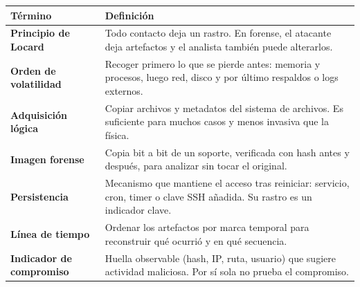 \documentclass[11pt,a4paper]{article}
\begin{document}
\small
\begin{longtable}{@{}>{\raggedright\arraybackslash}p{4.2cm}>{\raggedright\arraybackslash}p{\dimexpr\linewidth-4.2cm-12pt\relax}@{}}
\toprule
\textbf{Término} & \textbf{Definición}\\
\midrule
\endhead
\bottomrule
\endlastfoot
\textbf{Principio de Locard} & Todo contacto deja un rastro. En forense, el atacante deja artefactos y el analista también puede alterarlos.\\
\textbf{Orden de volatilidad} & Recoger primero lo que se pierde antes: memoria y procesos, luego red, disco y por último respaldos o logs externos.\\
\textbf{Adquisición lógica} & Copiar archivos y metadatos del sistema de archivos. Es suficiente para muchos casos y menos invasiva que la física.\\
\textbf{Imagen forense} & Copia bit a bit de un soporte, verificada con hash antes y después, para analizar sin tocar el original.\\
\textbf{Persistencia} & Mecanismo que mantiene el acceso tras reiniciar: servicio, cron, timer o clave SSH añadida. Su rastro es un indicador clave.\\
\textbf{Línea de tiempo} & Ordenar los artefactos por marca temporal para reconstruir qué ocurrió y en qué secuencia.\\
\textbf{Indicador de compromiso} & Huella observable (hash, IP, ruta, usuario) que sugiere actividad maliciosa. Por sí sola no prueba el compromiso.\\
\end{longtable}
\end{document}
